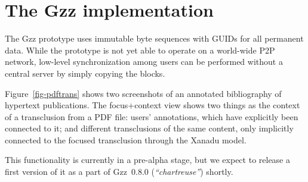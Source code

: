 \documentclass{sig-alternate}
\begin{document}
\section{The Gzz implementation}

The Gzz prototype\cite{gzz} uses immutable byte sequences with GUIDs 
for all permanent data. While the prototype
is not yet able to operate on a world-wide
P2P network, 
low-level synchronization among users can be performed without a central
server by simply copying the blocks.

Figure~\ref{fig-pdftrans} shows 
two screenshots of an
annotated bibliography of hypertext publications.
The focus+context\cite{fc-fisheye} view
shows two things as the context of a transclusion from a PDF file:
users' annotations, which have explicitly been connected to it; and
different transclusions of the same content, only implicitly connected
to the focused transclusion through the Xanadu model.

This functionality is currently in a pre-alpha stage, but we 
expect to release
a first version of it as a part of Gzz~0.8.0 (\emph{``chartreuse''}) shortly.







\end{document}

